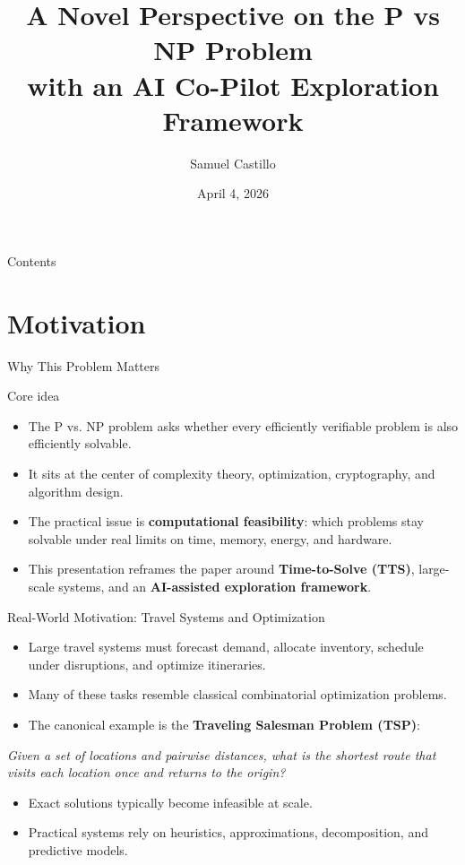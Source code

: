\documentclass[aspectratio=43]{beamer}
\title[P vs NP]{A Novel Perspective on the P vs NP Problem\\with an AI Co-Pilot Exploration Framework}
\author[Samuel Castillo]{Samuel Castillo}
\institute[UMass Amherst]{University of Massachusetts Amherst}
\date{April 4, 2026}
\begin{document}
\begin{frame}[plain]
\titlepage
\end{frame}

\begin{frame}{Contents}
\tableofcontents
\end{frame}

\section{Motivation}

\begin{frame}{Why This Problem Matters}
\begin{block}{Core idea}
\begin{itemize}
    \item The P vs\@. NP problem asks whether every efficiently verifiable problem is also efficiently solvable.
    \item It sits at the center of complexity theory, optimization, cryptography, and algorithm design.
    \item The practical issue is \textbf{computational feasibility}: which problems stay solvable under real limits on time, memory, energy, and hardware.
    \item This presentation reframes the paper around \textbf{Time-to-Solve (TTS)}, large-scale systems, and an \textbf{AI-assisted exploration framework}.
\end{itemize}
\end{block}
\end{frame}

\begin{frame}{Real-World Motivation: Travel Systems and Optimization}
\begin{itemize}
    \item Large travel systems must forecast demand, allocate inventory, schedule under disruptions, and optimize itineraries.
    \item Many of these tasks resemble classical combinatorial optimization problems.
    \item The canonical example is the \textbf{Traveling Salesman Problem (TSP)}:
\end{itemize}

\medskip
\centering
\emph{Given a set of locations and pairwise distances, what is the shortest route that visits each location once and returns to the origin?}

\medskip
\raggedright
\begin{itemize}
    \item Exact solutions typically become infeasible at scale.
    \item Practical systems rely on heuristics, approximations, decomposition, and predictive models.
\end{itemize}
\end{frame}
\end{document}
